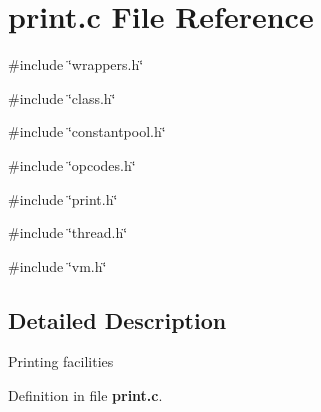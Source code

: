 \section{print.c File Reference}
\label{print_8c}
{\ttfamily \#include \char`\"{}wrappers.h\char`\"{}}\par
{\ttfamily \#include \char`\"{}class.h\char`\"{}}\par
{\ttfamily \#include \char`\"{}constantpool.h\char`\"{}}\par
{\ttfamily \#include \char`\"{}opcodes.h\char`\"{}}\par
{\ttfamily \#include \char`\"{}print.h\char`\"{}}\par
{\ttfamily \#include \char`\"{}thread.h\char`\"{}}\par
{\ttfamily \#include \char`\"{}vm.h\char`\"{}}\par


\subsection{Detailed Description}
Printing facilities 

Definition in file {\bf print.c}.

